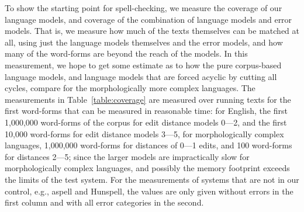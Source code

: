 \documentclass[a4paper,12pt]{article}
\begin{document}
To show the starting point for spell-checking, we measure the coverage of our
language models, and coverage of the combination of language models and error
models. That is, we measure how much of the texts themselves can be matched at
all, using just the language models themselves and the error models, and how
many of the word-forms are beyond the reach of the models. In this measurement,
we hope to get some estimate as to how the pure corpus-based language models,
and language models that are forced acyclic by cutting all cycles, compare for
the morphologically more complex languages. The measurements in
Table~\ref{table:coverage} are measured over running texts for the first
word-forms that can be measured in reasonable time: for English, the first
1,000,000 word-forms of the corpus for edit distance models 0---2, and the
first 10,000 word-forms for edit distance models 3---5, for morphologically
complex languages, 1,000,000 word-forms for distances of 0---1 edits, and 100
word-forms for distances 2---5; since the larger models are impractically slow
for morphologically complex languages, and possibly the memory footprint
exceeds the limits of the test system. For the measurements of systems that are
not in our control, e.g., aspell and Hunspell, the values are only given
without errors in the first column and with all error categories in the second.
\end{document}
